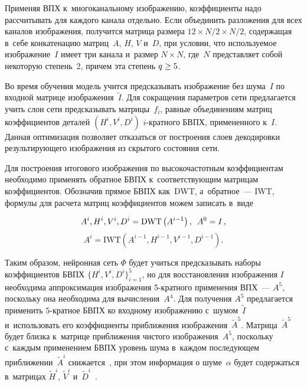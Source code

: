 \begin{multicols}{2}

\noindent 
Применяя ВПХ к~многоканальному изображению, коэффициенты надо рассчитывать 
для каждого канала отдельно. Если объединить разложения для всех каналов 
изображения, получится матрица размера $12 \times {N}/{2} \times 
{N}/{2}$, содержащая в~себе конкатенацию матриц~$A$, $H$, $V$ и~$D$, при 
условии, что используемое изображение~$I$ имеет три канала и~размер $N \times 
N$, где~$N$ представляет собой некоторую степень~2, причем эта степень $q \hm\ge 5$.

Во время обучения модель учится предсказывать изоб\-ра\-же\-ние без шума~$I$ по 
входной матрице изоб\-ра\-же\-ния~$\tilde{I}$. Для сокращения параметров сети 
предлагается учить слои сети предсказывать матрицы~$f_i$, равные объединениям 
матриц коэффициентов деталей $(H^i, V^i, D^i)$ $i$-крат\-но\-го БВПХ, примененного к~$I$. 
Данная оптимизация позволяет отказаться от построения слоев декодировки 
результирующего изображения из скрытого состояния сети.

Для построения итогового изображения по высокочастотным коэффициентам необходимо 
применять обратное БВПХ к~соответствующим матрицам коэффициентов. Обозначив 
прямое БВПХ как~DWT, а~обратное~--- IWT, формулы для расчета матриц 
коэффициентов можем записать в~виде

\noindent
\begin{equation*}
A^i, H^i, V^i, D^i = \mathrm{DWT}\left(A^{i-1}\right),\enskip A^0 = I\,,
\end{equation*}
\begin{equation*}
A^i =\mathrm{IWT}\left(A^{i-1}, H^{i-1}, V^{i-1}, D^{i-1}\right).
\end{equation*}

Таким образом, нейронная сеть $\Phi$ будет учиться предсказывать наборы 
коэффициентов БВПХ $\{H^i, V^i, D^i\}_{i=1}^5$, но для восстановления 
изображения $I$ необходима аппроксимация изображения \mbox{5-крат}\-но\-го применения ВПХ~--- 
$A^5$, поскольку она необходима для вычисления~$A^4$. Для получения $A^5$ предлагается применить $5$-кратное БВПХ ко входному изображению с~шумом~$\tilde{I}$ 
и~использовать его коэффициенты приближения изображения~$\tilde{A}^5$. Матрица~$\tilde{A}^5$ будет близка к~матрице приближения чистого 
изображения~$A^5$, поскольку с~каждым применением БВПХ уровень шума в~каждом 
последующем приближении~$\tilde{A}^i$ снижается~\cite{WAVELETS_APPROX}, при этом 
информация о шуме~$\alpha$ будет содержаться в~матрицах $\tilde{H}^i$, 
$\tilde{V}^i$ и~$\tilde{D}^i$~\cite{WAVELETS_NOISE}.


\end{multicols}
